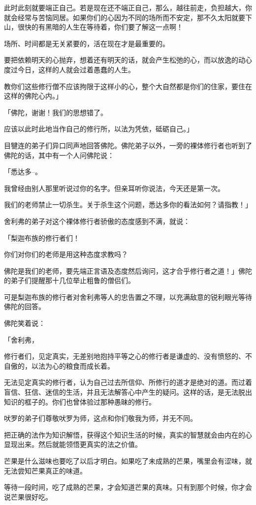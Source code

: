 \documentclass[twoside,openany]{book}
\begin{document}
此时此刻就要端正自己。若是现在还不端正自己，那么，越往前走，负担越大，你就会经常与苦恼同居。如果你们的心因为不同的场所而不安定，那不久太阳就要下山，很快的有黑暗的人生在等待着，你们要了解这一点啊！

场所、时间都是无关紧要的，活在现在才是最重要的。

要把依赖明天的心抛弃，想着还有明天的话，就会产生松弛的心，而以放逸的动心度过今日，这样的人就会过着愚蠢的人生。

教你们这些修行僧不应该拘限于这样小的心，整个大自然都是你们的住家，要住在这样的佛陀心内。」

「佛陀，谢谢！我们的思想错了。

应该以此时此地当作自己的修行所，以法为凭依，砥砺自己。」

目犍连的弟子们异口同声地回答佛陀。佛陀弟子以外，一旁的裸体修行者也听到了佛陀的话，其中有一个人问佛陀说：

「悉达多--。		

我曾经由别人那里听说过你的名字。但亲耳听你说法，今天还是第一次。

我们的老师禁止一切杀生。关于杀生这个问题，悉达多你的看法如何？请指教！」

舍利弗的弟子对这个裸体修行者骄傲的态度感到不满，就说：

「梨迦布族的修行者们！

你们对你们的老师是用这种态度求教吗？

佛陀是我们的老师，要先端正言语及态度然后询问，这才合乎修行者之道！」佛陀的弟子们提醒那十几位举止粗鲁的僧侣们。

可是梨迦布族的修行者对舍利弗等人的忠告置之不理，以充满敌意的锐利眼光等待佛陀的回答。

佛陀笑着说：

「舍利弗，

修行者们，见定真实，无差别地抱持平等之心的修行者是谦虚的、没有愤怒的、不自傲的，以法为心的粮食而成长着。

无法见定真实的修行者，认为自己过去所信仰、所修行的道才是绝对的道。而过着盲信、狂信、迷信的生活，并且无法解答心中产生的疑问。这样的话，是无法脱出知识的框子的。你们也曾体验过那种愚昧的修行。

吠罗的弟子们尊敬吠罗为师，这点和你们敬我为师，并无不同。

把正确的法作为知识解悟，获得这个知识生活的时候，真实的智慧就会由内在的心显现出来。然后就能领悟更真实的法之价值。

芒果是什么滋味也要吃了以后才明白。如果吃了未成熟的芒果，嘴里会有涩味，就无法尝知芒果真正的味道。

等待一段时间，吃了成熟的芒果，才会知道芒果的真味。只有到那个时候，你才会说芒果很好吃。
\end{document}
